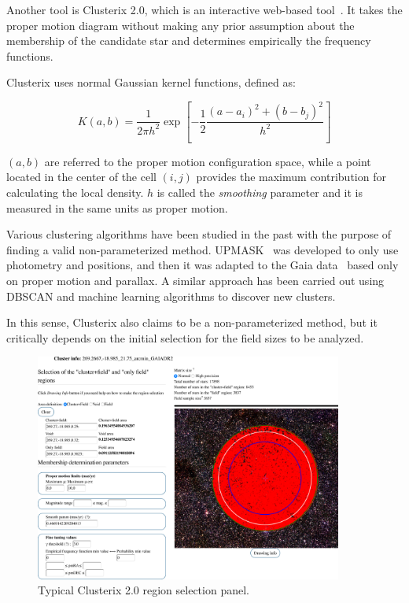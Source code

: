 \documentclass[11pt, a4paper, english]{book}
\begin{document}
Another tool is Clusterix 2.0, which is an interactive web-based tool~\cite{balaguer2020clusterix}.
It takes the proper motion diagram without making any prior assumption about the membership of the candidate star
and determines empirically the frequency functions.

Clusterix uses normal Gaussian kernel functions, defined as:

\begin{equation}
  K(a, b) = \frac{1}{2 \pi h^{2}} \exp{ \left[ - \frac{1}{2}\frac{\left( a - a_{i} \right)^{2} + \left( b - b_{j} \right)^{2}}{ h^{2}} \right]}
\end{equation}

\(\left( a, b \right)\) are referred to the proper motion configuration space,
while a point located in the center of the cell \(\left( i, j \right)\) provides the maximum
contribution for calculating the local density.
\(h\) is called the \emph{smoothing} parameter and it is measured in the same units as proper motion.

Various clustering algorithms have been studied in the past with the purpose of finding a valid non-parameterized method.
UPMASK~\cite{krone2014upmask} was developed to only use photometry and positions,
and then it was adapted to the Gaia data~\cite{cantat2018gaia} based only on proper motion and parallax.
A similar approach has been carried out using DBSCAN and machine learning algorithms to discover new clusters.

In this sense, Clusterix also claims to be a non-parameterized method,
but it critically depends on the initial selection for the field sizes to be analyzed.

\begin{figure}[htbp]
  \centering
  \includegraphics[width=0.9\textwidth]{../figures/clusterix/selection.pdf}
  \caption{Typical Clusterix 2.0 region selection panel.}
  \label{fig:clusterix_control_panel}
\end{figure}
\end{document}
